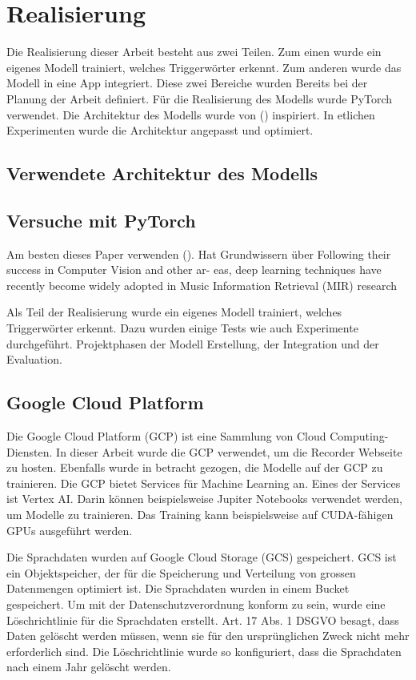 \documentclass[11pt,a4paper]{article}
\begin{document}
\newpage \section{Realisierung}
Die Realisierung dieser Arbeit besteht aus zwei Teilen. Zum einen wurde ein eigenes Modell
trainiert, welches Triggerwörter erkennt. Zum anderen wurde das Modell in eine App integriert. 
Diese zwei Bereiche wurden Bereits bei der Planung der Arbeit definiert. Für die Realisierung
des Modells wurde PyTorch verwendet. Die Architektur des Modells wurde von (\cite{siri2017hey})
inspiriert. In etlichen Experimenten wurde die Architektur angepasst und optimiert.

\subsection{Verwendete Architektur des Modells}

\subsection{Versuche mit PyTorch}




Am besten dieses Paper verwenden (\cite{choi2018tutorial}). Hat Grundwissern über 
Following their success in Computer Vision and other ar- eas, deep learning techniques have 
recently become widely adopted in Music Information Retrieval (MIR) research

Als Teil der Realisierung wurde ein eigenes Modell trainiert, welches Triggerwörter erkennt.
Dazu wurden einige Tests wie auch Experimente durchgeführt.
Projektphasen der Modell Erstellung, der Integration und der Evaluation.

\subsection{Google Cloud Platform}
Die Google Cloud Platform (GCP) ist eine Sammlung von Cloud Computing-Diensten. In dieser Arbeit
wurde die GCP verwendet, um die Recorder Webseite zu hosten. Ebenfalls wurde in betracht gezogen,
die Modelle auf der GCP zu trainieren. Die GCP bietet Services für Machine Learning an. Eines der
Services ist Vertex AI. Darin können beispielsweise Jupiter Notebooks verwendet werden, um Modelle
zu trainieren. Das Training kann beispielsweise auf CUDA-fähigen GPUs ausgeführt werden.

\noindent \newline
Die Sprachdaten wurden auf Google Cloud Storage (GCS) gespeichert. GCS ist ein Objektspeicher, der
für die Speicherung und Verteilung von grossen Datenmengen optimiert ist. Die Sprachdaten wurden
in einem Bucket gespeichert. Um mit der Datenschutzverordnung konform zu sein, wurde eine 
Löschrichtlinie für die Sprachdaten erstellt. Art. 17 Abs. 1 DSGVO besagt, dass Daten gelöscht 
werden müssen, wenn sie für den ursprünglichen Zweck nicht mehr erforderlich sind. Die
Löschrichtlinie wurde so konfiguriert, dass die Sprachdaten nach einem Jahr gelöscht werden.
\end{document}
